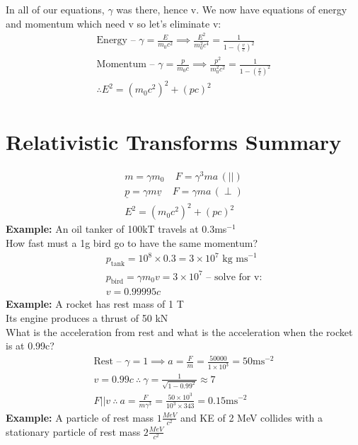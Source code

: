 \documentclass[a4paper, 11pt, fleqn, normalem]{report}
\begin{document}
In all of our equations, $\gamma$ was there, hence v. We now have equations of energy and momentum which need v so let's eliminate v:
\begin{gather*}
    \text{Energy -- }\gamma = \frac{E}{m_{0}c^{2}} \implies \frac{E^{2}}{m_{0}^{2}c^{4}} = \frac{1}{1 - (\tfrac{v}{c})^{2}} \\
    \text{Momentum -- }\gamma = \frac{p}{m_{0}c} \implies \frac{p^{2}}{m_{0}^{2}c^{2}} = \frac{1}{1 - (\tfrac{v}{c})^{2}} \\
    \therefore E^{2} = (m_{0}c^{2})^{2} + (pc)^{2}
\end{gather*}

\section{Relativistic Transforms Summary}
\vspace{-22pt}
\begin{gather*}
    m = \gamma m_{0}~~~~~F = \gamma^{3}ma\,(||) \\
    \underline{p} = \gamma m\underline{v}~~~~~F = \gamma ma\,(\perp) \\
    E^{2} = (m_{0}c^{2})^{2} + (pc)^{2}
\end{gather*}
\textbf{Example: }An oil tanker of 100kT travels at 0.3ms$^{-1}$ \\
How fast must a 1g bird go to have the same momentum?
\begin{gather*}
    p_{\text{tank}} = 10^{8}\times0.3 = 3\times10^{7}\text{ kg ms}^{-1}\\
    p_{\text{bird}} = \gamma m_{0}v = 3\times10^{7}\text{ -- solve for v:} \\
    v = 0.99995c
\end{gather*}
\textbf{Example: }A rocket has rest mass of 1 T \\
Its engine produces a thrust of 50 kN \\
What is the acceleration from rest and what is the acceleration when the rocket is at 0.99c?
\begin{gather*}
    \text{Rest -- }\gamma = 1 \implies a = \frac{F}{m} = \frac{50000}{1\times10^{3}} = 50\text{ms}^{-2} \\
    v = 0.99c~\therefore~\gamma = \frac{1}{\sqrt{1 - 0.99^{2}}} \approx 7 \\
    F || v ~\therefore~ a = \frac{F}{m\gamma^{3}} = \frac{50\times10^{3}}{10^{3}\times343} = 0.15\text{ms}^{-2}
\end{gather*}
\textbf{Example: }A particle of rest mass $1\frac{MeV}{c^{2}}$ and KE of 2 MeV collides with a stationary particle of rest mass $2\frac{MeV}{c^{2}}$ \\
\end{document}
